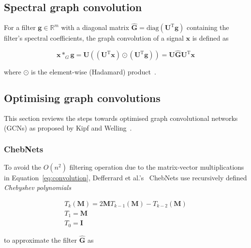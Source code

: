 

\subsection{Spectral graph convolution}

For a filter $\mathbf{g} \in \mathbb{R}^m$ with a diagonal matrix $\mathbf{\hat{G}} = \mathrm{diag}(\mathbf{U}^\mathrm{T}\mathbf{g})$ containing the filter's spectral coefficients, the graph convolution of a signal $\mathbf{x}$ is defined as

\begin{equation}
    \label{eq:convolution}
    \mathbf{x} *_G \mathbf{g} = \mathbf{U}((\mathbf{U}^\mathrm{T}\mathbf{x}) \odot (\mathbf{U}^\mathrm{T}\mathbf{g})) = \mathbf{U}\mathbf{\hat{G}}\mathbf{U}^\mathrm{T}\mathbf{x}
\end{equation}

where $\odot$ is the element-wise (Hadamard) product~\cite{wu2019simplifying}.

\subsection{Optimising graph convolutions}
This section reviews the steps towards optimised graph convolutional networks (GCNs) as proposed by Kipf and Welling~\cite{kipf2017semi}.

\subsubsection{ChebNets}
To avoid the $O(n^2)$ filtering operation due to the matrix-vector multiplications in Equation~\eqref{eq:convolution}, Defferrard et al.'s~\cite{defferrard2016convolutional} ChebNets use recursively defined \textit{Chebyshev polynomials}

\begin{gather}
    T_k(\mathbf{M}) = 2\mathbf{M}T_{k-1}(\mathbf{M}) - T_{k-2}(\mathbf{M}) \\
    T_1 = \mathbf{M} \\
    T_0 = \mathbf{I}
\end{gather}

to approximate the filter $\mathbf{\hat{G}}$ as 

